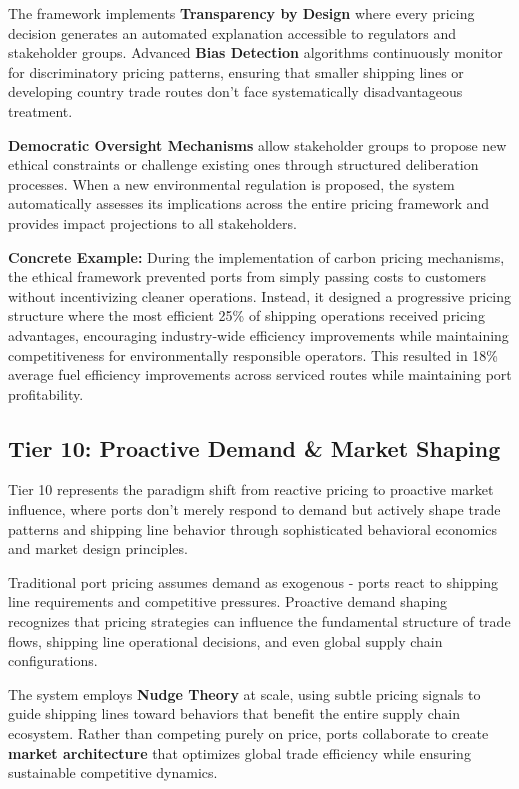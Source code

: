 \documentclass{article}
\begin{document}
The framework implements \textbf{Transparency by Design} where every pricing decision generates an automated explanation accessible to regulators and stakeholder groups. Advanced \textbf{Bias Detection} algorithms continuously monitor for discriminatory pricing patterns, ensuring that smaller shipping lines or developing country trade routes don't face systematically disadvantageous treatment.

\textbf{Democratic Oversight Mechanisms} allow stakeholder groups to propose new ethical constraints or challenge existing ones through structured deliberation processes. When a new environmental regulation is proposed, the system automatically assesses its implications across the entire pricing framework and provides impact projections to all stakeholders.

\textbf{Concrete Example:} During the implementation of carbon pricing mechanisms, the ethical framework prevented ports from simply passing costs to customers without incentivizing cleaner operations. Instead, it designed a progressive pricing structure where the most efficient 25\% of shipping operations received pricing advantages, encouraging industry-wide efficiency improvements while maintaining competitiveness for environmentally responsible operators. This resulted in 18\% average fuel efficiency improvements across serviced routes while maintaining port profitability.

\subsection{Tier 10: Proactive Demand \& Market Shaping}

Tier 10 represents the paradigm shift from reactive pricing to proactive market influence, where ports don't merely respond to demand but actively shape trade patterns and shipping line behavior through sophisticated behavioral economics and market design principles.

Traditional port pricing assumes demand as exogenous - ports react to shipping line requirements and competitive pressures. Proactive demand shaping recognizes that pricing strategies can influence the fundamental structure of trade flows, shipping line operational decisions, and even global supply chain configurations.

The system employs \textbf{Nudge Theory} at scale, using subtle pricing signals to guide shipping lines toward behaviors that benefit the entire supply chain ecosystem. Rather than competing purely on price, ports collaborate to create \textbf{market architecture} that optimizes global trade efficiency while ensuring sustainable competitive dynamics.
\end{document}

